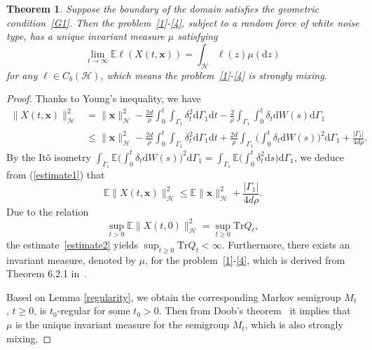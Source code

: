 \documentclass[10pt]{elsarticle}
\newtheorem{theorem}{Theorem}
\begin{document}
\begin{theorem}\label{mixing}
Suppose the boundary of the domain satisfies the geometric condition~\eqref{G1}. Then the problem~\eqref{1}-\eqref{4}, subject to a random force of white noise type, has a unique invariant measure $\mu$ satisfying
\[
	\lim_{t\rightarrow\infty}\mathbb{E}\ell(X(t, \mathbf{x}))=\int_{\mathcal{H}}\ell(z)\mu(\mathrm{d}z)
\]
for any $\ell\in C_{b}(\mathcal{H})$, 
which means the problem~\eqref{1}-\eqref{4} is strongly mixing.
\end{theorem}
\begin{proof}
Thanks to Young's inequality, we have
 \begin{equation}\label{estimate1}
 \begin{aligned}
 	\|X(t, \mathbf{x})\|^{2}_{\mathcal{H}}&=\|\mathbf{x}\|^{2}_{\mathcal{H}}-{\frac{2d}{\rho}}\int_{0}^{t}\int_{\Gamma_1}\delta^{2}_{t}\mathrm{d}\Gamma_1 \mathrm{d}t-{\frac{2}{\rho}}\int_{\Gamma_1}\int_{0}^{t}\delta_{t}\mathrm{d}W(s) \mathrm{d}\Gamma_1 \\
	&\leq \|\mathbf{x}\|^{2}_{\mathcal{H}}-{\frac{2d}{\rho}}\int_{0}^{t}\int_{\Gamma_1}\delta^{2}_{t}\mathrm{d}\Gamma_1 \mathrm{d}t+{\frac{2d}{\rho}}\int_{\Gamma_1}\big(\int_{0}^{t}\delta_{t}\mathrm{d}W(s)\big)^2\mathrm{ d}\Gamma_1+\frac{|\Gamma_1|}{4d{\rho}}.
\end{aligned}
\end{equation} 
By the It\^o isometry $\int_{\Gamma_1}\mathbb{E}\big(\int_{0}^{t}\delta_{t}\mathrm{d}W(s)\big)^2 \mathrm{d}\Gamma_1=\int_{\Gamma_1}\mathbb{E}\big(\int_{0}^{t}\delta^2_{t}\mathrm{d}s\big) \mathrm{d}\Gamma_1$,  we deduce from (\ref{estimate1}) that
 \begin{equation}\label{estimate2}
 	\mathbb{E}\|X(t, \mathbf{x})\|^{2}_{\mathcal{H}}\leq\mathbb{E}\|\mathbf{x}\|^{2}_{\mathcal{H}}+\frac{|\Gamma_1|}{4d{\rho}}.
\end{equation}
Due to the relation 
\[
\sup\limits_{t>0}\mathbb{E}\|X(t, 0)\|^{2}_{\mathcal{H}}=\sup\limits_{t\geq0}\textrm{Tr}Q_t,
\] 
the estimate~\eqref{estimate2} yields $\sup_{t\geq0}\textrm{Tr}Q_t < \infty$. 
Furthermore, there exists an invariant measure, denoted by $\mu$, for the problem~\eqref{1}-\eqref{4}, which is derived from Theorem 6.2.1 in~\cite{PratoZabczyk}. 

Based on Lemma \ref{regularity}, we obtain the corresponding Markov semigroup $M_t$, $t\geqslant 0$, is $t_0$-regular for some $t_0>0$. Then from Doob's theorem~\cite{Doob} it implies that $\mu$ is the unique invariant measure for the semigroup $M_t$, which is also strongly mixing.
\end{proof}
\end{document}
